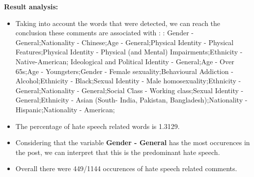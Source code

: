 \documentclass[11pt]{article}
\begin{document}
\textbf{\Large Result analysis:}

\begin{itemize}\item Taking into account the words that were detected, we can reach the conclusion these comments are associated with : : Gender - General;Nationality - Chinese;Age - General;Physical Identity - Physical Features;Physical Identity - Physical (and Mental) Impairments;Ethnicity - Native-American; Ideological and Political Identity - General;Age - Over 65s;Age - Youngsters;Gender - Female sexuality;Behavioural Addiction - Alcohol;Ethnicity - Black;Sexual Identity - Male homosexuality;Ethnicity - General;Nationality - General;Social Class - Working class;Sexual Identity - General;Ethnicity - Asian (South- India, Pakistan, Bangladesh);Nationality - Hispanic;Nationality - American;%

\item The percentage of hate speech related words is 1.3129.

\item Considering that the variable \textbf{Gender - General} has the most occurences in the post, we can interpret that this is the predominant hate speech.

\item Overall there were 449/1144 occurences of hate speech related comments.\end{itemize}
\end{document}
